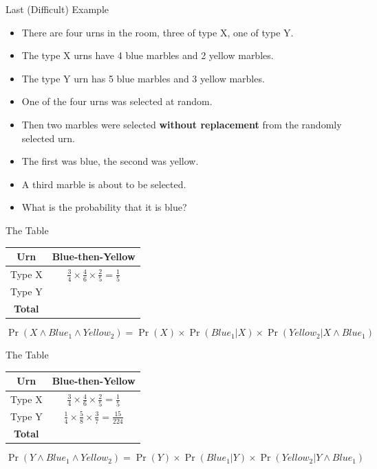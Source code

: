 \documentclass[
  ignorenonframetext,
]{beamer}
\providecommand{\tightlist}{%
  \setlength{\itemsep}{0pt}\setlength{\parskip}{0pt}}
\renewcommand{\,}{\text{, }}
\begin{document}
\begin{frame}{Last (Difficult) Example}
\protect\hypertarget{last-difficult-example}{}

\begin{itemize}
\tightlist
\item
  There are four urns in the room, three of type X, one of type Y.
\item
  The type X urns have 4 blue marbles and 2 yellow marbles.
\item
  The type Y urn has 5 blue marbles and 3 yellow marbles.
\item
  One of the four urns was selected at random.
\item
  Then two marbles were selected \textbf{without replacement} from the
  randomly selected urn.
\item
  The first was blue, the second was yellow.
\item
  A third marble is about to be selected.
\item
  What is the probability that it is blue?
\end{itemize}

\end{frame}

\begin{frame}{The Table}
\protect\hypertarget{the-table-6}{}

\begin{longtable}[]{@{}cc@{}}
\toprule
Urn & Blue-then-Yellow\tabularnewline
\midrule
\endhead
Type X &
\(\frac{3}{4} \times \frac{4}{6} \times \frac{2}{5} = \frac{1}{5}\)\tabularnewline
Type Y &\tabularnewline
\textbf{Total} &\tabularnewline
\bottomrule
\end{longtable}

\[
\Pr(X \wedge Blue_1 \wedge Yellow_2) = \Pr(X) \times \Pr(Blue_1 | X) \times \Pr(Yellow_2 | X \wedge Blue_1)
\]

\end{frame}

\begin{frame}{The Table}
\protect\hypertarget{the-table-7}{}

\begin{longtable}[]{@{}cc@{}}
\toprule
Urn & Blue-then-Yellow\tabularnewline
\midrule
\endhead
Type X &
\(\frac{3}{4} \times \frac{4}{6} \times \frac{2}{5} = \frac{1}{5}\)\tabularnewline
Type Y &
\(\frac{1}{4} \times \frac{5}{8} \times \frac{3}{7} = \frac{15}{224}\)\tabularnewline
\textbf{Total} &\tabularnewline
\bottomrule
\end{longtable}

\[
\Pr(Y \wedge Blue_1 \wedge Yellow_2) = \Pr(Y) \times \Pr(Blue_1 | Y) \times \Pr(Yellow_2 | Y \wedge Blue_1)
\]

\end{frame}
\end{document}
